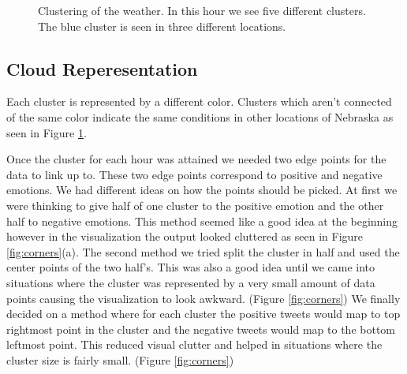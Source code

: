 \documentclass[journal]{vgtc}                %
\begin{document}
\begin{figure}[htp]
  \centering
  \quad
\caption{Clustering of the weather. In this hour we see five different clusters. The blue cluster is seen in three different locations.}
\label{fig:blur}
\end{figure}

\subsection{Cloud Reperesentation}
Each cluster is represented by a different color. Clusters which aren't connected of the same color indicate the same conditions in other locations of Nebraska as seen in Figure \ref{fig:blur}.

Once the cluster for each hour was attained we needed two edge points for the data to link up to. These two edge points correspond to positive and negative emotions. We had different ideas on how the points should be picked. At first we were thinking to give half of one cluster to the positive emotion and the other half to negative emotions. This method seemed like a good idea at the beginning however in the visualization the output looked cluttered as seen in Figure \ref{fig:corners}(a). The second method we tried split the cluster in half and used the center points of the two half's. This was also a good idea until we came into situations where the cluster was represented by a very small amount of data points causing the visualization to look awkward. (Figure \ref{fig:corners}) We finally decided on a method where for each cluster the positive tweets would map to top rightmost point in the cluster and the negative tweets would map to the bottom leftmost point. This reduced visual clutter and helped in situations where the cluster size is fairly small. (Figure \ref{fig:corners})
\end{document}

